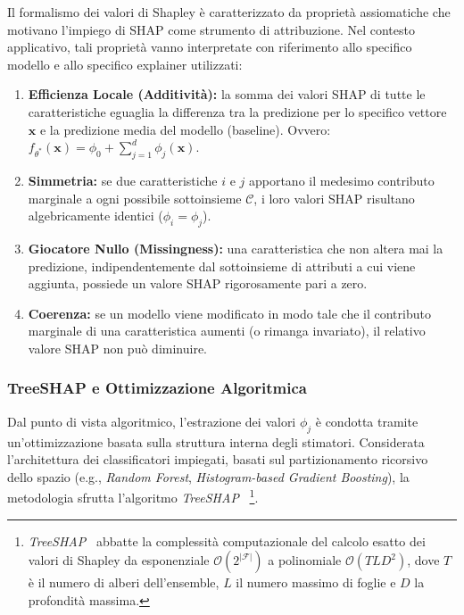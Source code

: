 Il formalismo dei valori di Shapley è caratterizzato da proprietà assiomatiche che motivano l'impiego di SHAP come strumento di attribuzione. Nel contesto applicativo, tali proprietà vanno interpretate con riferimento allo specifico modello e allo specifico explainer utilizzati:
\begin{enumerate}
    \item \textbf{Efficienza Locale (Additività):} la somma dei valori SHAP di tutte le caratteristiche eguaglia la differenza tra la predizione per lo specifico vettore $\mathbf{x}$ e la predizione media del modello (baseline). Ovvero: $f_{\theta^*}(\mathbf{x}) = \phi_0 + \sum_{j=1}^{d} \phi_j(\mathbf{x})$.
    \item \textbf{Simmetria:} se due caratteristiche $i$ e $j$ apportano il medesimo contributo marginale a ogni possibile sottoinsieme $\mathcal{C}$, i loro valori SHAP risultano algebricamente identici ($\phi_i = \phi_j$).
    \item \textbf{Giocatore Nullo (Missingness):} una caratteristica che non altera mai la predizione, indipendentemente dal sottoinsieme di attributi a cui viene aggiunta, possiede un valore SHAP rigorosamente pari a zero.
    \item \textbf{Coerenza:} se un modello viene modificato in modo tale che il contributo marginale di una caratteristica aumenti (o rimanga invariato), il relativo valore SHAP non può diminuire.
\end{enumerate}

\subsubsection{TreeSHAP e Ottimizzazione Algoritmica}
\label{subsubsec:treeshap}

Dal punto di vista algoritmico, l'estrazione dei valori $\phi_j$ è condotta tramite un'ottimizzazione basata sulla struttura interna degli stimatori. Considerata l'architettura dei classificatori impiegati, basati sul partizionamento ricorsivo dello spazio (e.g., \textit{Random Forest}, \textit{Histogram-based Gradient Boosting}), la metodologia sfrutta l'algoritmo \textit{TreeSHAP}~\cite{lundberg2019} \footnote{\textit{TreeSHAP}~\cite{lundberg2019} abbatte la complessità computazionale del calcolo esatto dei valori di Shapley da esponenziale $\mathcal{O}(2^{|\mathcal{F}|})$ a polinomiale $\mathcal{O}(T L D^2)$, dove $T$ è il numero di alberi dell'ensemble, $L$ il numero massimo di foglie e $D$ la profondità massima.}.


